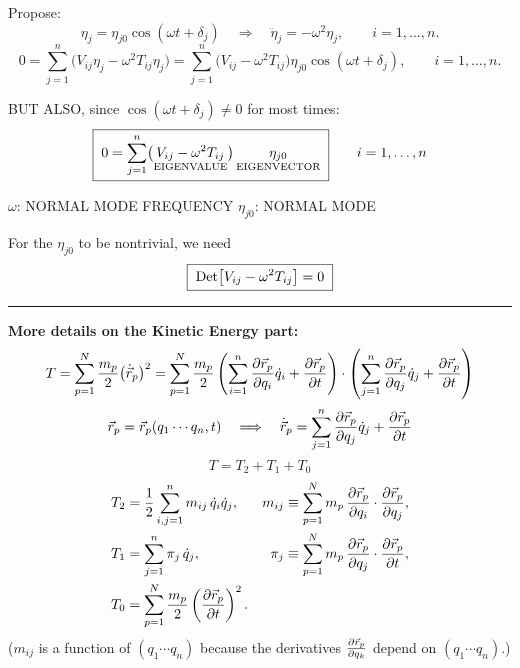 \documentclass[11pt]{article}
\begin{document}
Propose:
\begin{equation*}
  \eta_j = \eta_{j0}\cos(\omega t + \delta_j)
  \quad\Longrightarrow\quad
  \ddot\eta_j = -\omega^2 \eta_j ,
  \qquad i = 1,\dots,n .
\end{equation*}
\begin{equation*}
  0 = \sum_{j=1}^{n}\bigl(V_{ij}\eta_j - \omega^2 T_{ij}\eta_j\bigr)
    = \sum_{j=1}^{n}\bigl(V_{ij} - \omega^2 T_{ij}\bigr)\eta_{j0}\cos(\omega t + \delta_j) ,
  \qquad i = 1,\dots,n .
\end{equation*}

BUT ALSO, since $\cos(\omega t + \delta_j)\neq 0$ for most times:
\begin{equation*}
  \boxed{\;
    0 = \sum_{j=1}^{n}
        \bigl(\underset{\text{EIGENVALUE}}{V_{ij} - \omega^2 T_{ij}}\bigr)\,
        \underset{\text{EIGENVECTOR}}{\eta_{j0}} \;}
  \qquad i = 1,\dots,n
\end{equation*}
\begin{center}
  $\omega$: NORMAL MODE FREQUENCY \qquad $\eta_{j0}$: NORMAL MODE
\end{center}

For the $\eta_{j0}$ to be nontrivial, we need
\begin{equation*}
  \boxed{\;\operatorname{Det}\bigl[V_{ij} - \omega^2 T_{ij}\bigr] = 0\;}
\end{equation*}

\hrule\vspace{6pt}

\begin{aside}
\textbf{More details on the Kinetic Energy part:}
\begin{gather*}
  T = \sum_{p=1}^{N}\frac{m_p}{2}\bigl(\dot{\vec r}_p\bigr)^2
    = \sum_{p=1}^{N}\frac{m_p}{2}
      \left(\sum_{i=1}^{n}\frac{\partial \vec r_p}{\partial q_i}\dot q_i + \frac{\partial \vec r_p}{\partial t}\right)
      \cdot
      \left(\sum_{j=1}^{n}\frac{\partial \vec r_p}{\partial q_j}\dot q_j + \frac{\partial \vec r_p}{\partial t}\right)\\[2pt]
  \vec r_p = \vec r_p(q_1\cdots q_n, t)
  \quad\Longrightarrow\quad
  \dot{\vec r}_p = \sum_{j=1}^{n}\frac{\partial \vec r_p}{\partial q_j}\dot q_j + \frac{\partial \vec r_p}{\partial t}
\end{gather*}
\begin{equation*}
  T = T_2 + T_1 + T_0
\end{equation*}
\begin{align*}
  T_2 &= \frac{1}{2}\sum_{i,j=1}^{n} m_{ij}\,\dot q_i \dot q_j ,
    & m_{ij} &\equiv \sum_{p=1}^{N} m_p\, \frac{\partial \vec r_p}{\partial q_i}\cdot\frac{\partial \vec r_p}{\partial q_j} ,\\
  T_1 &= \sum_{j=1}^{n} \pi_j\,\dot q_j ,
    & \pi_j &\equiv \sum_{p=1}^{N} m_p\, \frac{\partial \vec r_p}{\partial q_j}\cdot\frac{\partial \vec r_p}{\partial t} ,\\
  T_0 &= \sum_{p=1}^{N} \frac{m_p}{2}\left(\frac{\partial \vec r_p}{\partial t}\right)^{2} . & &
\end{align*}
\noindent
($m_{ij}$ is a function of $(q_1\cdots q_n)$ because the derivatives
$\frac{\partial \vec r_p}{\partial q_k}$ depend on $(q_1\cdots q_n)$.)
\end{aside}
\end{document}
